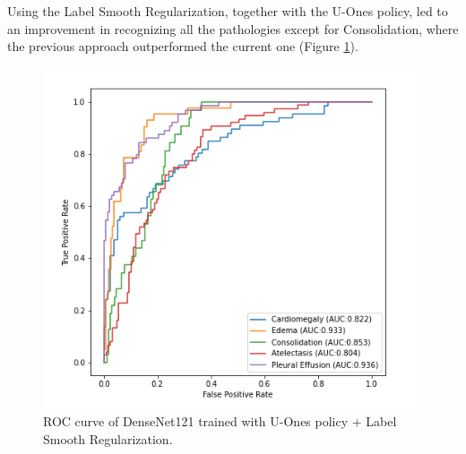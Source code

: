\newpage

Using the Label Smooth Regularization, together with the U-Ones policy, led to an improvement in recognizing all the pathologies except for Consolidation, where the previous approach outperformed the current one (Figure \ref{fig:figure_5.3}).

\begin{figure}[htbp!]
    \centering
    \includegraphics[scale=0.55]{Tesi/images/Results/densenet121_LSR (1).png}
    \caption[ROC curve for U-Ones+LSR policy]{ROC curve of DenseNet121 trained with U-Ones policy + Label Smooth Regularization.}
    \label{fig:figure_5.3}
\end{figure}


